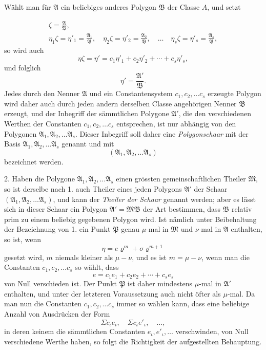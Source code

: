 \documentclass{article}
\begin{document}
Wählt man für $\mathfrak{A}$ ein beliebiges anderes Polygon $\mathfrak{B}$ der Classe $A$, und setzt

\[ \begin{gathered} \zeta = \frac{\mathfrak{A}}{\mathfrak{B}}, \\ \eta_{1}\zeta = \eta'_{1} = \frac{\mathfrak{A}_{1}}{\mathfrak{B}}, \quad \eta_{2}\zeta = \eta'_{2} = \frac{\mathfrak{A}_{2}}{\mathfrak{B}}, \quad \ldots \quad \eta_{s}\zeta = \eta'_{s} = \frac{\mathfrak{A}_{s}}{\mathfrak{B}}, \end{gathered} \]
so wird auch
\[ \eta\zeta = \eta' = c_{1}\eta'_{1} + c_{2}\eta'_{2} + \cdots + c_{s}\eta'_{s}, \]
und folglich
\[ \eta' = \frac{\mathfrak{A}'}{\mathfrak{B}}. \]
Jedes durch den Nenner $\mathfrak{A}$ und ein Constantensystem $c_{1}, c_{2}, \ldots c_{s}$ erzeugte Polygon wird daher auch durch jeden andern derselben Classe angehörigen Nenner $\mathfrak{B}$ erzeugt, und der Inbegriff der sämmtlichen Polygone $\mathfrak{A}'$, die den verschiedenen Werthen der Constanten $c_{1}, c_{2}, \ldots c_{s}$ entsprechen, ist nur abhängig von den Polygonen $\mathfrak{A}_{1}, \mathfrak{A}_{2}, \ldots \mathfrak{A}_{s}$. Dieser Inbegriff soll daher eine \emph{Polygonschaar} mit der Basis $\mathfrak{A}_{1}, \mathfrak{A}_{2}, \ldots \mathfrak{A}_{s}$ genannt und mit
\[ (\mathfrak{A}_{1}, \mathfrak{A}_{2}, \ldots \mathfrak{A}_{s}) \]
bezeichnet werden.

2. Haben die Polygone $\mathfrak{A}_{1}, \mathfrak{A}_{2}, \ldots \mathfrak{A}_{s}$ einen grössten gemeinschaftlichen Theiler $\mathfrak{M}$, so ist derselbe nach 1. auch Theiler eines jeden Polygons $\mathfrak{A}'$ der Schaar $(\mathfrak{A}_{1}, \mathfrak{A}_{2}, \ldots \mathfrak{A}_{s})$, und kann der \emph{Theiler der Schaar} genannt werden; aber es lässt sich in dieser Schaar ein Polygon $\mathfrak{A}' = \mathfrak{M}\mathfrak{B}$ der Art bestimmen, dass $\mathfrak{B}$ relativ prim zu einem beliebig gegebenen Polygon wird. Ist nämlich unter Beibehaltung der Bezeichnung von 1. ein Punkt $\mathfrak{P}$ genau $\mu$-mal in $\mathfrak{M}$ und $\nu$-mal in $\mathfrak{A}$ enthalten, so ist, wenn
\[ \eta = e\varrho^{m} + \sigma\varrho^{m+1} \]
gesetzt wird, $m$ niemals kleiner als $\mu - \nu$, und es ist $m = \mu - \nu$, wenn man die Constanten $c_{1}, c_{2}, \ldots c_{s}$ so wählt, dass
\[ e = c_{1}e_{1} + c_{2}e_{2} + \cdots + c_{s}e_{s} \]
von Null verschieden ist. Der Punkt $\mathfrak{P}$ ist daher mindestens $\mu$-mal in $\mathfrak{A}'$ enthalten, und unter der letzteren Voraussetzung auch nicht öfter als $\mu$-mal. Da man nun die Constanten $c_{1}, c_{2}, \ldots c_{s}$ immer so wählen kann, dass eine beliebige Anzahl von Ausdrücken der Form
\[ \Sigma c_{\iota}e_{\iota}, \quad \Sigma c_{\iota}e'_{\iota}, \quad \ldots, \]
in deren keinem die sämmtlichen Constanten $e_{\iota}, e'_{\iota}, \ldots$ verschwinden, von Null verschiedene Werthe haben, so folgt die Richtigkeit der aufgestellten Behauptung.
\end{document}
